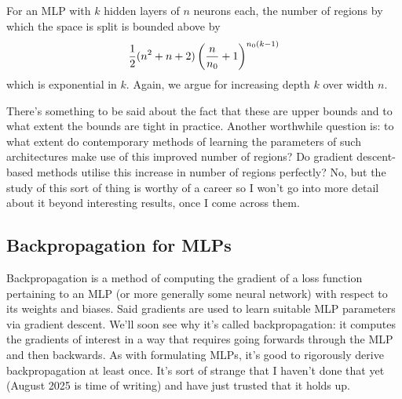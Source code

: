 \documentclass[11pt]{article}
\begin{document}
For an MLP with $k$ hidden layers of $n$ neurons each, the number of regions by which the space is split is bounded above by
$$
\frac{1}{2}(n^2+n+2)\left(\frac{n}{n_0}+1\right)^{n_0(k-1)}
$$
which is exponential in $k$. Again, we argue for increasing depth $k$ over width $n$.

There's something to be said about the fact that these are upper bounds and to what extent the bounds are tight in practice. Another worthwhile question is: to what extent do contemporary methods of learning the parameters of such architectures make use of this improved number of regions? Do gradient descent-based methods utilise this increase in number of regions perfectly? No, but the study of this sort of thing is worthy of a career so I won't go into more detail about it beyond interesting results, once I come across them.

\subsection{Backpropagation for MLPs}
\label{subsec:backprop}

Backpropagation is a method of computing the gradient of a loss function pertaining to an MLP (or more generally some neural network) with respect to its weights and biases. Said gradients are used to learn suitable MLP parameters via gradient descent. We'll soon see why it's called backpropagation: it computes the gradients of interest in a way that requires going forwards through the MLP and then backwards. As with formulating MLPs, it's good to rigorously derive backpropagation at least once. It's sort of strange that I haven't done that yet (August 2025 is time of writing) and have just trusted that it holds up.
\end{document}
